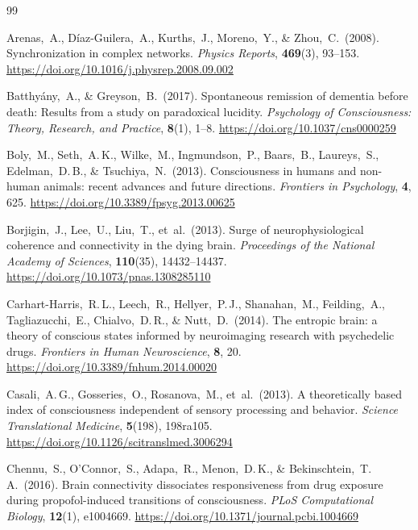 \documentclass[11pt,a4paper]{article}
\theoremstyle{plain}
\theoremstyle{definition}
\theoremstyle{remark}
\begin{document}
\newpage
\begin{thebibliography}{99}

Arenas,~A., D{\'i}az-Guilera,~A., Kurths,~J., Moreno,~Y., \& Zhou,~C.\ (2008).
Synchronization in complex networks.
\textit{Physics Reports}, \textbf{469}(3), 93--153.
\url{https://doi.org/10.1016/j.physrep.2008.09.002}

Batthy{\'a}ny,~A., \& Greyson,~B.\ (2017).
Spontaneous remission of dementia before death: Results from a study on paradoxical lucidity.
\textit{Psychology of Consciousness: Theory, Research, and Practice}, \textbf{8}(1), 1--8.
\url{https://doi.org/10.1037/cns0000259}

Boly,~M., Seth,~A.\,K., Wilke,~M., Ingmundson,~P., Baars,~B., Laureys,~S., Edelman,~D.\,B., \& Tsuchiya,~N.\ (2013).
Consciousness in humans and non-human animals: recent advances and future directions.
\textit{Frontiers in Psychology}, \textbf{4}, 625.
\url{https://doi.org/10.3389/fpsyg.2013.00625}

Borjigin,~J., Lee,~U., Liu,~T., et~al.\ (2013).
Surge of neurophysiological coherence and connectivity in the dying brain.
\textit{Proceedings of the National Academy of Sciences}, \textbf{110}(35), 14432--14437.
\url{https://doi.org/10.1073/pnas.1308285110}

Carhart-Harris,~R.\,L., Leech,~R., Hellyer,~P.\,J., Shanahan,~M., Feilding,~A., Tagliazucchi,~E., Chialvo,~D.\,R., \& Nutt,~D.\ (2014).
The entropic brain: a theory of conscious states informed by neuroimaging research with psychedelic drugs.
\textit{Frontiers in Human Neuroscience}, \textbf{8}, 20.
\url{https://doi.org/10.3389/fnhum.2014.00020}

Casali,~A.\,G., Gosseries,~O., Rosanova,~M., et~al.\ (2013).
A theoretically based index of consciousness independent of sensory processing and behavior.
\textit{Science Translational Medicine}, \textbf{5}(198), 198ra105.
\url{https://doi.org/10.1126/scitranslmed.3006294}

Chennu,~S., O'Connor,~S., Adapa,~R., Menon,~D.\,K., \& Bekinschtein,~T.\,A.\ (2016).
Brain connectivity dissociates responsiveness from drug exposure during propofol-induced transitions of consciousness.
\textit{PLoS Computational Biology}, \textbf{12}(1), e1004669.
\url{https://doi.org/10.1371/journal.pcbi.1004669}


\end{thebibliography}
\end{document}
